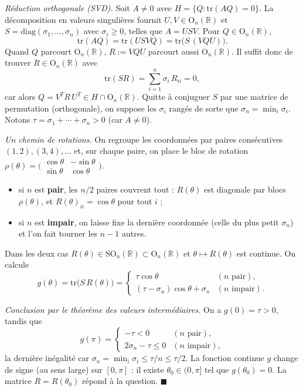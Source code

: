 \begin{mdframed}[style=proofbar]
  \textit{Réduction orthogonale (SVD).}\enspace%
  Soit $A \neq 0$ avec $H = \{Q : \mathrm{tr}(AQ)=0\}$. La décomposition en
  valeurs singulières fournit $U,V \in \mathrm{O}_n(\mathbb{R})$ et
  $S = \mathrm{diag}(\sigma_1,\ldots,\sigma_n)$ avec $\sigma_i \geq 0$, telles
  que $A = U S V$. Pour $Q \in \mathrm{O}_n(\mathbb{R})$,
  \[
    \mathrm{tr}(AQ) = \mathrm{tr}(U S V Q) = \mathrm{tr}\bigl(S\,(VQU)\bigr).
  \]
  Quand $Q$ parcourt $\mathrm{O}_n(\mathbb{R})$, $R := VQU$ parcourt aussi
  $\mathrm{O}_n(\mathbb{R})$. Il suffit donc de trouver $R \in \mathrm{O}_n(\mathbb{R})$
  avec
  \[
    \mathrm{tr}(SR) = \sum_{i=1}^{n} \sigma_i\,R_{ii} = 0,
  \]
  car alors $Q = V^T R\, U^T \in H \cap \mathrm{O}_n(\mathbb{R})$.
  Quitte à conjuguer $S$ par une matrice de permutation (orthogonale), on
  suppose les $\sigma_i$ rangés de sorte que $\sigma_n = \min_i \sigma_i$.
  Notons $\tau = \sigma_1 + \cdots + \sigma_n > 0$ (car $A \neq 0$).

  \medskip
  \textit{Un chemin de rotations.}\enspace%
  On regroupe les coordonnées par paires consécutives $(1,2),(3,4),\ldots$ et,
  sur chaque paire, on place le bloc de rotation
  $\rho(\theta) = \bigl(\begin{smallmatrix}\cos\theta & -\sin\theta\\ \sin\theta & \cos\theta\end{smallmatrix}\bigr)$.
  \begin{itemize}
    \item si $n$ est \textbf{pair}, les $n/2$ paires couvrent tout : $R(\theta)$
          est diagonale par blocs $\rho(\theta)$, et $R(\theta)_{ii} = \cos\theta$
          pour tout $i$ ;
    \item si $n$ est \textbf{impair}, on laisse fixe la dernière coordonnée
          (celle du plus petit $\sigma_n$) et l'on fait tourner les $n-1$ autres.
  \end{itemize}
  Dans les deux cas $R(\theta) \in \mathrm{SO}_n(\mathbb{R}) \subset \mathrm{O}_n(\mathbb{R})$
  et $\theta \mapsto R(\theta)$ est continue. On calcule
  \[
    g(\theta) = \mathrm{tr}\bigl(S\,R(\theta)\bigr) =
    \begin{cases}
      \tau\cos\theta & (n \text{ pair}),\\[4pt]
      (\tau - \sigma_n)\cos\theta + \sigma_n & (n \text{ impair}).
    \end{cases}
  \]

  \medskip
  \textit{Conclusion par le théorème des valeurs intermédiaires.}\enspace%
  On a $g(0) = \tau > 0$, tandis que
  \[
    g(\pi) =
    \begin{cases}
      -\tau < 0 & (n \text{ pair}),\\[4pt]
      2\sigma_n - \tau \leq 0 & (n \text{ impair}),
    \end{cases}
  \]
  la dernière inégalité car $\sigma_n = \min_i \sigma_i \leq \tau/n \leq \tau/2$.
  La fonction continue $g$ change de signe (au sens large) sur $[0,\pi]$ : il
  existe $\theta_0 \in (0,\pi]$ tel que $g(\theta_0) = 0$. La matrice
  $R = R(\theta_0)$ répond à la question. \hfill$\blacksquare$
\end{mdframed}

